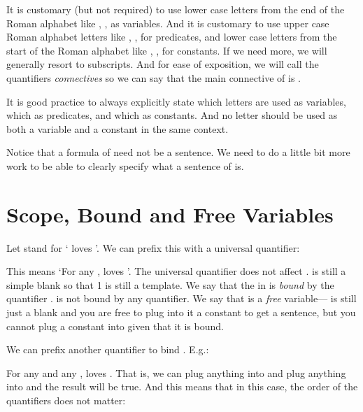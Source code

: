 It is customary (but not required) to use lower case letters from the end of the 
Roman alphabet like , ,  as variables.    And it is customary to 
use upper case Roman alphabet letters like , ,  for predicates, 
and lower case letters from the start of the Roman alphabet like , , 
 for constants.  If we need more, we will generally resort to subscripts.  
And for ease of exposition, we will call the quantifiers \emph{connectives} so 
we can say that the main connective of  is . 

It is good practice to always explicitly state which letters are used as 
variables, which as predicates, and which as constants. And no letter should be 
used as both a variable and a constant in the same context.

Notice that a formula of \lL[Q]{} need not be a sentence. We need to do a little 
bit more work to be able to clearly specify what a sentence of \lL[Q]{} is.



\section{Scope, Bound and Free Variables}


Let  stand for ` loves '. We can prefix this with a universal 
quantifier:

\begin{argument}
 \aitem {}
\end{argument}

This means `For any ,  loves '. The universal quantifier does not 
affect .  is still a simple blank so that 1 is still a template.  We 
say that the  in  is \emph{bound} by the quantifier 
.   is not bound by any quantifier. We say that  is a \emph{free} 
variable--- is still just a blank and you are free to plug into it a 
constant to get a sentence, but you cannot plug a constant into  given that 
it is bound.  

We can prefix another quantifier to bind . E.g.:

\begin{argument}
 \aitem {}
\end{argument}

For any  and any ,  loves . That is, we can plug anything 
into  and plug anything into  and the result will be true. And this 
means that in this case, the order of the quantifiers does not matter:

